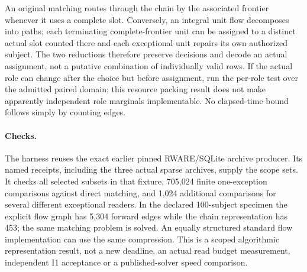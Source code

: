 \documentclass[11pt]{article}
\begin{document}
An original matching routes through the chain by the associated
frontier whenever it uses a complete slot. Conversely, an integral
unit flow decomposes into paths; each terminating complete-frontier
unit can be assigned to a distinct actual slot counted there and each
exceptional unit repairs its own authorized subject. The two reductions
therefore preserve decisions and decode an actual assignment, not a
putative combination of individually valid rows. If the actual role
can change after the choice but before assignment, run the per-role
test over the admitted paired domain; this resource packing result
does not make apparently independent role marginals implementable.
No elapsed-time bound follows simply by counting edges.

\paragraph{Checks.}
The harness reuses the exact earlier pinned RWARE/SQLite archive
producer. Its named receipts, including the three actual sparse
archives, supply the scope sets. It checks all selected subsets
in that fixture, 705,024 finite one-exception comparisons against
direct matching, and 1,024 additional comparisons for several
different exceptional readers. In the declared 100-subject specimen
the explicit flow graph has 5,304 forward edges while the chain
representation has 453; the same matching problem is solved. An
equally structured standard flow implementation can use the same
compression. This is a scoped algorithmic representation result,
not a new deadline, an actual read budget measurement, independent
I1 acceptance or a published-solver speed comparison.
\end{document}
